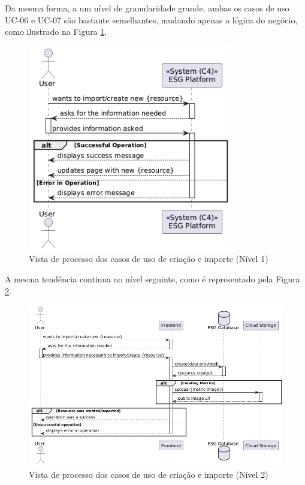 Da mesma forma, a um nível de granularidade grande, ambas os casos de uso UC-06 e UC-07 são bastante semelhantes, mudando apenas a lógica do negócio, como ilustrado na Figura \ref{fig:UC67-lvl1}.

\begin{figure}[H]
\centering
\includegraphics[width=3.5in]{frontmatter/assets/diagrams/Process Views/UC67-lvl1.png}
\caption{Vista de processo dos casos de uso de criação e importe (Nível 1)}
\label{fig:UC67-lvl1}
\end{figure}

A mesma tendência continua no nível seguinte, como é representado pela Figura \ref{fig:UC67-lvl2}.

\begin{figure}[H]
\centering
\includegraphics[width=\linewidth]{frontmatter/assets/diagrams/Process Views/UC67-lvl2.png}
\caption{Vista de processo dos casos de uso de criação e importe (Nível 2)}
\label{fig:UC67-lvl2}
\end{figure}

